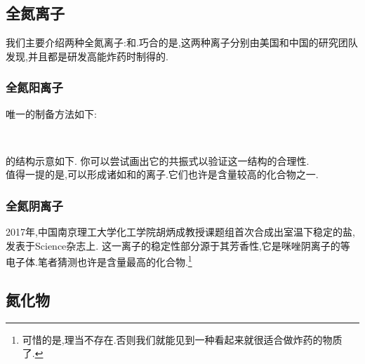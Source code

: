 \documentclass{ctexart}
\begin{document}
\subsection{全氮离子}
我们主要介绍两种全氮离子:和.巧合的是,这两种离子分别由美国和中国的研究团队发现,并且都是研发高能炸药时制得的.
\subsubsection{全氮阳离子}
唯一的制备方法如下:
\begin{center}
    \\
\end{center}
的结构示意如下.
你可以尝试画出它的共振式以验证这一结构的合理性.\\
\indent 值得一提的是,可以形成诸如\ce{[N5]+[P(N3)6]-}和\ce{[N5]+[B(N3)4]-}的离子.它们也许是含量较高的化合物之一.
\subsubsection{全氮阴离子}
2017年,中国南京理工大学化工学院胡炳成教授课题组首次合成出室温下稳定的盐,发表于Science杂志上.
这一离子的稳定性部分源于其芳香性,它是咪唑阴离子的等电子体.笔者猜测也许是含量最高的化合物.\footnote{可惜的是,\ce{[N5]+[N5]-}理当不存在.否则我们就能见到一种看起来就很适合做炸药的物质了.}
\subsection{氮化物}
\end{document}
